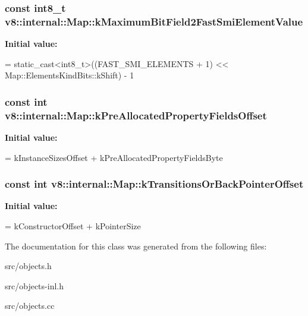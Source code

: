 \subsubsection[{k\+Maximum\+Bit\+Field2\+Fast\+Smi\+Element\+Value}]{\setlength{\rightskip}{0pt plus 5cm}const int8\+\_\+t v8\+::internal\+::\+Map\+::k\+Maximum\+Bit\+Field2\+Fast\+Smi\+Element\+Value\hspace{0.3cm}{\ttfamily [static]}}\label{classv8_1_1internal_1_1_map_a252325defbc9ac4d665ee6a7ef5863f4}
{\bfseries Initial value\+:}
\begin{DoxyCode}
=
      \textcolor{keyword}{static\_cast<}int8\_t\textcolor{keyword}{>}((FAST\_SMI\_ELEMENTS + 1) <<
                          Map::ElementsKindBits::kShift) - 1
\end{DoxyCode}
\hypertarget{classv8_1_1internal_1_1_map_aa3c49fd741ab78990e7635ea0e49f118}{}
\subsubsection[{k\+Pre\+Allocated\+Property\+Fields\+Offset}]{\setlength{\rightskip}{0pt plus 5cm}const int v8\+::internal\+::\+Map\+::k\+Pre\+Allocated\+Property\+Fields\+Offset\hspace{0.3cm}{\ttfamily [static]}}\label{classv8_1_1internal_1_1_map_aa3c49fd741ab78990e7635ea0e49f118}
{\bfseries Initial value\+:}
\begin{DoxyCode}
=
      kInstanceSizesOffset + kPreAllocatedPropertyFieldsByte
\end{DoxyCode}
\hypertarget{classv8_1_1internal_1_1_map_ab56ef1564a2a8131d902cd9465562393}{}
\subsubsection[{k\+Transitions\+Or\+Back\+Pointer\+Offset}]{\setlength{\rightskip}{0pt plus 5cm}const int v8\+::internal\+::\+Map\+::k\+Transitions\+Or\+Back\+Pointer\+Offset\hspace{0.3cm}{\ttfamily [static]}}\label{classv8_1_1internal_1_1_map_ab56ef1564a2a8131d902cd9465562393}
{\bfseries Initial value\+:}
\begin{DoxyCode}
=
      kConstructorOffset + kPointerSize
\end{DoxyCode}


The documentation for this class was generated from the following files\+:\begin{DoxyCompactItemize}
\item 
src/objects.\+h\item 
src/objects-\/inl.\+h\item 
src/objects.\+cc\end{DoxyCompactItemize}
